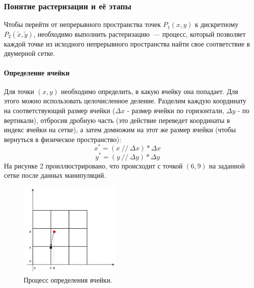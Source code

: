 \subsubsection*{Понятие растеризации и её этапы}
Чтобы перейти от непрерывного пространства точек $P_1(x, y)$ к дискретному $P_2(\tilde{x}, \tilde{y})$, необходимо выполнить растеризацию~--- процесс, который позволяет каждой точке из исходного непрерывного пространства найти свое соответствие в двумерной сетке.

\paragraph*{Определение ячейки}
Для точки $(x, y)$ необходимо определить, в какую ячейку она попадает. Для этого можно использовать целочисленное деление. Разделим каждую координату на соответствующий размер ячейки ($\Delta x$ - размер ячейки по горизонтали, $\Delta y$ - по вертикали), отбросив дробную часть (это действие переведет координаты в индекс ячейки на сетке), а затем домножим на этот же размер ячейки (чтобы вернуться в физическое пространство):
\[
    x^* = (x \ \texttt{//} \ \Delta x) * \Delta x
\]
\[
    y^* = (y \ \texttt{//} \ \Delta y) * \Delta y
\]
На рисунке 2 проиллюстрировано, что происходит с точкой $(6, 9)$ на заданной сетке после данных манипуляций.
\begin{figure}[H]
    \centering
    \includegraphics[width = 5cm]{second_step.jpg}
    \caption{Процесс определения ячейки.}
    \label{fig:float}
\end{figure}

